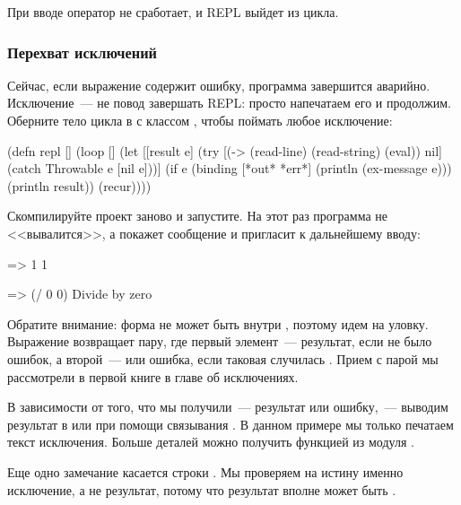 При вводе  оператор  не сработает, и REPL выйдет из цикла.

\subsubsection{Перехват исключений}

Сейчас, если выражение содержит ошибку, программа завершится аварийно. Исключение~--- не повод завершать REPL: просто напечатаем его и продолжим. Оберните тело цикла в  с классом , чтобы поймать любое исключение:

\begin{english}
  \begin{clojure/lines}
(defn repl []
  (loop []
    (let [[result e]
          (try
            [(-> (read-line)
                 (read-string)
                 (eval))
             nil]
            (catch Throwable e
              [nil e]))]
      (if e
        (binding [*out* *err*]
          (println (ex-message e)))
        (println result))
      (recur))))
  \end{clojure/lines}
\end{english}

Скомпилируйте проект заново и запустите. На этот раз программа не <<вывалится>>, а покажет сообщение и пригласит к дальнейшему вводу:

\begin{english}
  \begin{clojure}
=> 1
1

=> (/ 0 0)
Divide by zero
  \end{clojure}
\end{english}

Обратите внимание: форма  не может быть внутри , поэтому идем на уловку. Выражение  возвращает пару, где первый элемент~--- результат, если не было ошибок, а второй~---  или ошибка, если таковая случилась . Прием с парой мы рассмотрели в первой книге в главе об исключениях.

В зависимости от того, что мы получили~--- результат или ошибку,~--- выводим результат в  или  при помощи связывания . В данном примере мы только печатаем текст исключения. Больше деталей можно получить функцией  из модуля .

Еще одно замечание касается строки  . Мы проверяем на истину именно исключение, а не результат, потому что результат вполне может быть .

